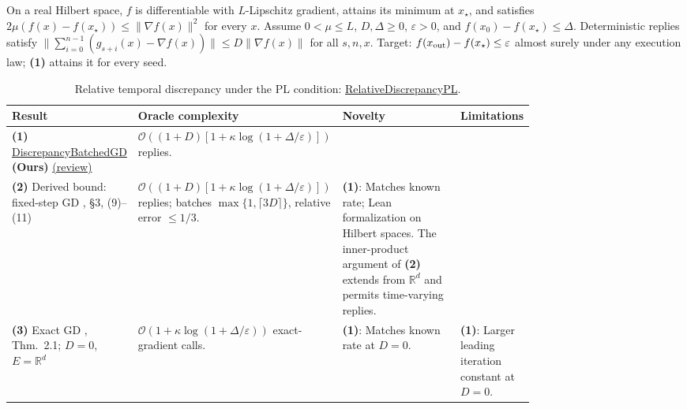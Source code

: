 \begin{table}[tp]
\centering
\caption{Relative temporal discrepancy under the PL condition: \href{https://github.com/k3nfalt/longtails/blob/main/LongTails/Setups/RelativeDiscrepancyPL.lean}{RelativeDiscrepancyPL}.}\label{tab:RelativeDiscrepancyPL}
\parbox{\linewidth}{\footnotesize On a real Hilbert space, $f$ is differentiable with $L$-Lipschitz gradient, attains its minimum at $x_\star$, and satisfies $2\mu(f(x)-f(x_\star))\le\|\nabla f(x)\|^2$ for every $x$. Assume $0<\mu\le L$, $D,\Delta\ge0$, $\varepsilon>0$, and $f(x_0)-f(x_\star)\le\Delta$. Deterministic replies satisfy $\|\sum_{i=0}^{n-1}(g_{s+i}(x)-\nabla f(x))\|\le D\|\nabla f(x)\|$ for all $s,n,x$. Target: $f(x_{\rm out})-f(x_\star)\le\varepsilon$ almost surely under any execution law; \textbf{(1)} attains it for every seed.}\par\smallskip
\begin{threeparttable}
\footnotesize
\setlength{\tabcolsep}{4pt}\renewcommand{\arraystretch}{1.25}
\begin{tabularx}{\linewidth}{@{}>{\raggedright\arraybackslash}p{0.20\linewidth}>{\raggedright\arraybackslash}p{0.32\linewidth}>{\raggedright\arraybackslash}p{0.25\linewidth}>{\raggedright\arraybackslash}X@{}}
\toprule
\textbf{Result} & \textbf{Oracle complexity} & \textbf{Novelty} & \textbf{Limitations} \\
\midrule
\textbf{(1)} \href{https://github.com/k3nfalt/longtails/blob/main/LongTails/Theorems/DiscrepancyBatchedGD.lean}{Discrepancy\allowbreak Batched\allowbreak GD} \textbf{(Ours)} \href{https://github.com/k3nfalt/longtails/blob/main/scripts/reviews/DiscrepancyBatchedGD.md}{(review)} & $\mathcal{O}((1+D)[1+\kappa\log(1+\Delta/\varepsilon)])$ replies. & & \\
\midrule[1.2pt]
\textbf{(2)} Derived bound: fixed-step GD \citep{rdplPuchinin2023v3}, \S3, (9)--(11) & $\mathcal{O}((1+D)[1+\kappa\log(1+\Delta/\varepsilon)])$ replies; batches $\max\{1,\lceil3D\rceil\}$, relative error $\le1/3$. & \textbf{(1)}: Matches known rate; Lean formalization on Hilbert spaces. The inner-product argument of \textbf{(2)} extends from $\mathbb R^d$ and permits time-varying replies. & \\
\midrule
\textbf{(3)} Exact GD \citep{rdplKarimi2020v4}, Thm.~2.1; $D=0$, $E=\mathbb R^d$ & $\mathcal{O}(1+\kappa\log(1+\Delta/\varepsilon))$ exact-gradient calls. & \textbf{(1)}: Matches known rate at $D=0$. & \textbf{(1)}: Larger leading iteration constant at $D=0$. \\
\midrule

\end{tabularx}
\end{threeparttable}
\end{table}
